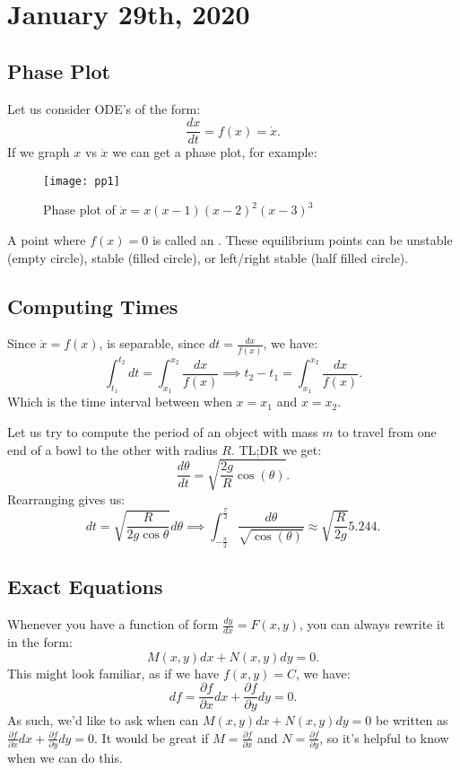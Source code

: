 \documentclass[../main/main.tex]{subfiles}
\begin{document}
\section{January 29th, 2020}
\subsection{Phase Plot}
Let us consider ODE's of the form: \[
	\frac{dx}{dt}=f(x)=\dot{x}
.\] 
If we graph $x$ vs  $\dot{x}$ we can get a phase plot, for example:
\begin{figure}[htpb]
	\centering
	\texttt{[image: pp1]}
	\caption{Phase plot of $\dot{x}=x(x-1)(x-2)^2(x-3)^{3}$}
	\label{fig:pp1}
\end{figure}

\begin{definition}
	A point where $f(x)=0$ is called an . These equilibrium points can be unstable (empty circle), stable (filled circle), or left/right stable (half filled circle).
\end{definition}

\subsection{Computing Times}
Since $\dot{x} = f(x)$, is separable, since  $dt = \frac{dx}{f(x)}$, we have: \[
	\int^{t_2}_{t_1} dt = \int^{x_2}_{x_1}\frac{dx}{f(x)} \implies t_2-t_1 = \int ^{x_2}_{x_1}\frac{dx}{f(x)}
.\] Which is the time interval between when $x=x_1$ and $x=x_2$.
\begin{example}
	Let us try to compute the period of an object with mass $m$ to travel from one end of a bowl to the other with radius  $R$. TL;DR we get:  \[
		\frac{d\theta}{dt} = \sqrt{\frac{2g}{R}\cos(\theta)} 
	.\] Rearranging gives us: \[
	dt=\sqrt{\frac{R}{2g\cos\theta}} d\theta \implies \int_{-\frac{\pi}{2}}^{\frac{\pi}{2}} \frac{d\theta}{\sqrt{\cos(\theta)} } \approx \sqrt{\frac{R}{2g}} 5.244 
	.\] 
\end{example}
\subsection{Exact Equations}
Whenever you have a function of form $\frac{dy}{dx}=F(x,y)$, you can always rewrite it in the form: \[
	M(x,y) dx+N(x,y)dy=0
.\] This might look familiar, as if we have $f(x,y)=C$, we have:  \[
df = \frac{\partial f}{\partial x} dx + \frac{\partial f}{\partial y} dy=0
.\] As such, we'd like to ask when can $M(x,y)dx + N(x,y) dy=0$ be written as $\frac{\partial f}{\partial x} dx +\frac{\partial f}{\partial y} dy = 0$. It would be great if $M=\frac{\partial f}{\partial x} $ and $N=\frac{\partial f}{\partial y} $, so it's helpful to know when we can do this.
\end{document}
